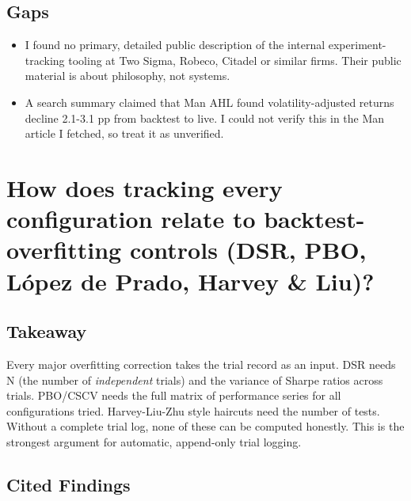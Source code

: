 \documentclass{article}
\begin{document}
\subsection{Gaps}

\begin{itemize}

\item I found no primary, detailed public description of the internal experiment-tracking tooling at Two Sigma, Robeco, Citadel or similar firms. Their public material is about philosophy, not systems.

\item A search summary claimed that Man AHL found volatility-adjusted returns decline 2.1-3.1 pp from backtest to live. I could not verify this in the Man article I fetched, so treat it as unverified.

\end{itemize}

\section{How does tracking every configuration relate to backtest-overfitting controls (DSR, PBO, López de Prado, Harvey \& Liu)?}

\subsection{Takeaway}

Every major overfitting correction takes the trial record as an input. DSR needs N (the number of \emph{independent} trials) and the variance of Sharpe ratios across trials. PBO/\allowbreak{}CSCV needs the full matrix of performance series for all configurations tried. Harvey-Liu-Zhu style haircuts need the number of tests. Without a complete trial log, none of these can be computed honestly. This is the strongest argument for automatic, append-only trial logging.

\subsection{Cited Findings}
\end{document}
